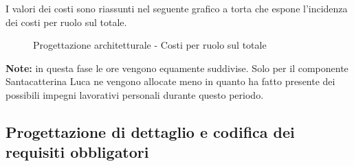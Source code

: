			\noindent
			I valori dei costi sono riassunti nel seguente grafico a torta che espone l’incidenza dei costi per ruolo sul totale.
			\begin{center}
				\begin{figure}[htbp]
				\vspace{0.8cm}
				\caption{Progettazione architetturale - Costi per ruolo sul totale}
				\end{figure}
			\end{center}
		\noindent
		\textbf{Note:} in questa fase le ore vengono equamente suddivise. Solo per il componente Santacatterina Luca ne vengono allocate meno in quanto ha fatto presente dei possibili impegni lavorativi personali durante questo periodo.
	
	\newpage
	\subsection{Progettazione di dettaglio e codifica dei requisiti obbligatori} %
	\label{sub:progettazione_di_dettaglio_e_codifica_dei_requisiti_obbligatori}

